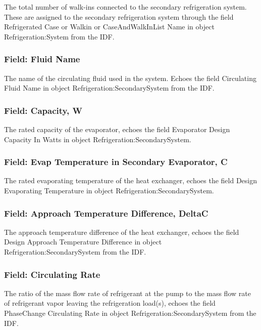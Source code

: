 The total number of walk-ins connected to the secondary refrigeration system. These are assigned to the secondary refrigeration system through the field Refrigerated Case or Walkin or CaseAndWalkInList Name in object Refrigeration:System from the IDF.

\subsubsection{Field: Fluid Name}\label{field-fluid-name-1}

The name of the circulating fluid used in the system. Echoes the field Circulating Fluid Name in object Refrigeration:SecondarySystem from the IDF.

\subsubsection{Field: Capacity, W}\label{field-capacity-w-1}

The rated capacity of the evaporator, echoes the field Evaporator Design Capacity In Watts in object Refrigeration:SecondarySystem.

\subsubsection{Field: Evap Temperature in Secondary Evaporator, C}\label{field-evap-temperature-in-secondary-evaporator-c-1}

The rated evaporating temperature of the heat exchanger, echoes the field Design Evaporating Temperature in object Refrigeration:SecondarySystem.

\subsubsection{Field: Approach Temperature Difference, DeltaC}\label{field-approach-temperature-difference-deltac-2}

The approach temperature difference of the heat exchanger, echoes the field Design Approach Temperature Difference in object Refrigeration:SecondarySystem from the IDF.

\subsubsection{Field: Circulating Rate}\label{field-circulating-rate}

The ratio of the mass flow rate of refrigerant at the pump to the mass flow rate of refrigerant vapor leaving the refrigeration load(s), echoes the field PhaseChange Circulating Rate in object Refrigeration:SecondarySystem from the IDF.

